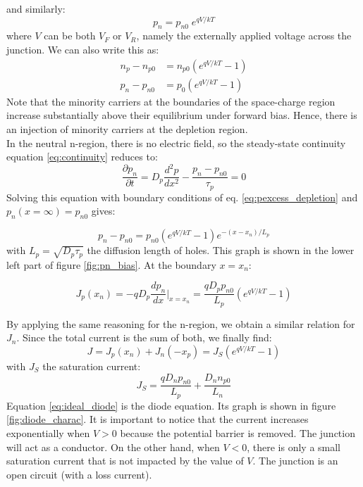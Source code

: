 and similarly:
\begin{equation}
	p_n = p_{n0}\;e^{qV/kT}
	\label{eq:density_junction}
\end{equation}
where $V$ can be both $V_F$ or $V_R$, namely the externally applied voltage across the junction. We can also write this as:
\begin{equation}
	\begin{split}
		n_p - n_{p0} &= n_{p0}(e^{qV/kT} - 1) \\
		p_n - p_{n0} &= p_{0}(e^{qV/kT} - 1)
	\end{split}
\label{eq:pexcess_depletion}
\end{equation}
Note that the minority carriers at the boundaries of the space-charge region increase substantially above their equilibrium under forward bias. Hence, there is an injection of minority carriers at the depletion region.\\
In the neutral n-region, there is no electric field, so the steady-state continuity equation \ref{eq:continuity} reduces to:
\begin{equation}
\frac{\partial p_n}{\partial t} = D_p \frac{d^2p}{dx^2} - \frac{p_n - p_{n0}}{\tau_p} = 0
\end{equation} 
Solving this equation with boundary conditions of eq. \ref{eq:pexcess_depletion} and $p_n(x = \infty) = p_{n0}$ gives:

\begin{equation}
p_n - p_{n0} =  p_{n0} (e^{qV/kT} - 1) e^{-(x-x_n)/L_p}
\end{equation} 
with $L_p = \sqrt{D_p \tau_p}$ the diffusion length of holes. This graph is shown in the lower left part of figure \ref{fig:pn_bias}. At the boundary $x=x_n$:

\begin{equation}
J_p(x_n) = -qD_p \frac{dp_n}{dx}\Bigg|_{x=x_n} = \frac{qD_pp_{n0}}{L_p}(e^{qV/kT} - 1)
\end{equation} 

By applying the same reasoning for the n-region, we obtain a similar relation for $J_n$. Since the total current is the sum of both, we finally find:
\begin{equation}
J = J_p(x_n) + J_n(-x_p) = J_S(e^{qV/kT} - 1)
\label{eq:ideal_diode}
\end{equation} 
with $J_S$ the saturation current:
\begin{equation}
J_S = \frac{qD_n p_{n0}}{L_p} + \frac{D_n n_{p0}}{L_n}
\end{equation} 
Equation \ref{eq:ideal_diode} is the diode equation. Its graph is shown in figure \ref{fig:diode_charac}. It is important to notice that the current increases exponentially when $V>0$ because the potential barrier is removed. The junction will act as a conductor. On the other hand, when $V<0$, there is only a small saturation current that is not impacted by the value of $V$. The junction is an open circuit (with a loss current).

